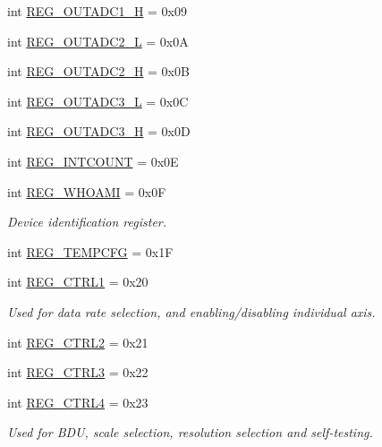 \begin{DoxyCompactItemize}
\item 
int \mbox{\hyperlink{classlis3dh_1_1_l_i_s3_d_h_a38e7cf16596958be814615841c4f8443}{R\+E\+G\+\_\+\+O\+U\+T\+A\+D\+C1\+\_\+H}} = 0x09
\item 
int \mbox{\hyperlink{classlis3dh_1_1_l_i_s3_d_h_a0eb70f1c227ace435dc61c21e591561d}{R\+E\+G\+\_\+\+O\+U\+T\+A\+D\+C2\+\_\+L}} = 0x0A
\item 
int \mbox{\hyperlink{classlis3dh_1_1_l_i_s3_d_h_ab923ac3ce9a8abb138f99d0a05206f2d}{R\+E\+G\+\_\+\+O\+U\+T\+A\+D\+C2\+\_\+H}} = 0x0B
\item 
int \mbox{\hyperlink{classlis3dh_1_1_l_i_s3_d_h_a5a4789aa090bde5d8967c4cb3aa58439}{R\+E\+G\+\_\+\+O\+U\+T\+A\+D\+C3\+\_\+L}} = 0x0C
\item 
int \mbox{\hyperlink{classlis3dh_1_1_l_i_s3_d_h_a8d015173705e3a7ea79ebcc4430156b5}{R\+E\+G\+\_\+\+O\+U\+T\+A\+D\+C3\+\_\+H}} = 0x0D
\item 
int \mbox{\hyperlink{classlis3dh_1_1_l_i_s3_d_h_a5e6a3ce67e851d3dadb112f54990876b}{R\+E\+G\+\_\+\+I\+N\+T\+C\+O\+U\+NT}} = 0x0E
\item 
int \mbox{\hyperlink{classlis3dh_1_1_l_i_s3_d_h_ae41e1d9f256935de57c488bc82b0aa4d}{R\+E\+G\+\_\+\+W\+H\+O\+A\+MI}} = 0x0F
\begin{DoxyCompactList}\small\item\em Device identification register. \end{DoxyCompactList}\item 
int \mbox{\hyperlink{classlis3dh_1_1_l_i_s3_d_h_aee70199ddbb99df7fa67525d0fb9fcbd}{R\+E\+G\+\_\+\+T\+E\+M\+P\+C\+FG}} = 0x1F
\item 
int \mbox{\hyperlink{classlis3dh_1_1_l_i_s3_d_h_a3fa72640307c373b3555ea0e75a1b8ed}{R\+E\+G\+\_\+\+C\+T\+R\+L1}} = 0x20
\begin{DoxyCompactList}\small\item\em Used for data rate selection, and enabling/disabling individual axis. \end{DoxyCompactList}\item 
int \mbox{\hyperlink{classlis3dh_1_1_l_i_s3_d_h_ab1e68126cd8ade9959a63a6a2e01a189}{R\+E\+G\+\_\+\+C\+T\+R\+L2}} = 0x21
\item 
int \mbox{\hyperlink{classlis3dh_1_1_l_i_s3_d_h_a8167a7c442af591830fc3a32361f763b}{R\+E\+G\+\_\+\+C\+T\+R\+L3}} = 0x22
\item 
int \mbox{\hyperlink{classlis3dh_1_1_l_i_s3_d_h_a9a08e21fc778363224492e8d4db09d31}{R\+E\+G\+\_\+\+C\+T\+R\+L4}} = 0x23
\begin{DoxyCompactList}\small\item\em Used for B\+DU, scale selection, resolution selection and self-\/testing. \end{DoxyCompactList}\item 

\end{DoxyCompactItemize}
